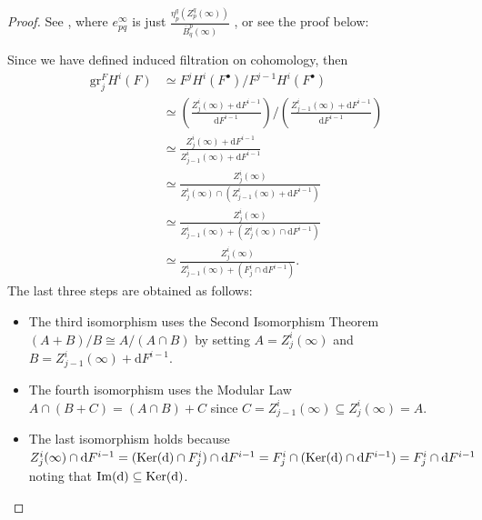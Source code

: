 \begin{proof}
    See \cite[Lemma~5.5.7.(3)]{Weibel1994HA}, where $e^\infty_{pq}$ is just $\frac{\eta_p^q(Z_p^q(\infty))}{\overline{B}^{p}_{q}(\infty)}$ \cite[Lemma~5.5.7.(1)]{Weibel1994HA}, or see the proof below:

    Since we have defined induced filtration on cohomology, then
    \begin{align*}
        \mathrm{gr}_{j}^{F}H^{i}(F) & \simeq  F^j H^i(F^\bullet) \big/ F^{j-1} H^i(F^\bullet)                                                                                                                  \\
                                    & \simeq \left(\frac{Z_j^{i}(\infty) + \mathrm{d}F^{i-1}}{\mathrm{d}F^{i-1}} \right) \big/ \left(\frac{Z_{j-1}^{i}(\infty) + \mathrm{d}F^{i-1}}{\mathrm{d}F^{i-1}} \right) \\
                                    & \simeq \frac{Z_j^{i}(\infty) + \mathrm{d}F^{i-1}}{Z_{j-1}^{i}(\infty) + \mathrm{d}F^{i-1}}                                                                               \\
                                    & \simeq \frac{Z_j^{i}(\infty)}{Z_j^{i}(\infty) \cap (Z_{j-1}^{i}(\infty) + \mathrm{d}F^{i-1})}                                                                            \\
                                    & \simeq \frac{Z_j^{i}(\infty)}{Z_{j-1}^{i}(\infty) + (Z_j^{i}(\infty) \cap \mathrm{d}F^{i-1})}                                                                            \\
                                    & \simeq \frac{Z_j^{i}(\infty)}{Z_{j-1}^{i}(\infty) + (F_j^{i} \cap \mathrm{d}F^{i-1})}.
    \end{align*}
    The last three steps are obtained as follows:
    \begin{itemize}
        \item The third isomorphism uses the Second Isomorphism Theorem $(A+B)/B \cong A/(A \cap B)$ by setting $A=Z_j^i(\infty)$ and $B=Z_{j-1}^i(\infty) + \mathrm{d}F^{i-1}$.
        \item The fourth isomorphism uses the Modular Law $A \cap (B+C) = (A \cap B) + C$ since $C=Z_{j-1}^i(\infty) \subseteq Z_j^i(\infty)=A$.
        \item The last isomorphism holds because $Z_j^i(\infty) \cap \mathrm{d}F^{i-1} = (\operatorname{Ker}(\mathrm{d}) \cap F_j^i) \cap \mathrm{d}F^{i-1} = F_j^i \cap (\operatorname{Ker}(\mathrm{d}) \cap \mathrm{d}F^{i-1}) = F_j^i \cap \mathrm{d}F^{i-1}$ noting that $\mathrm{Im}(\mathrm{d}) \subseteq \operatorname{Ker}(\mathrm{d})$.

\end{itemize}
\end{proof}
